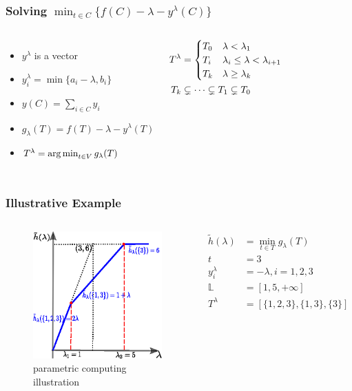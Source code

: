 \documentclass[notheorems]{beamer}
\begin{document}
\begin{frame}
	\frametitle{Solving $\min_{t\in C} \{f(C) - \lambda - y^{\lambda}(C)\}$}
	\begin{columns}
    \column{5.3cm}
    \begin{itemize}
	\item $y^{\lambda}$ is a vector
	\item $y^{\lambda}_i = \min\{a_i - \lambda, b_i\}$ 
	\item $y(C) = \sum_{i \in C} y_i$	
	\item $g_{\lambda}(T) = f(T) - \lambda - y^{\lambda}(T)$
	\item $T^{\lambda} = \operatorname*{arg\,min}_{t\in V} g_{\lambda}(T)$
	\end{itemize}
	\begin{theorem}
		\begin{align}\notag
			T^{\lambda} & =\begin{cases}
				T_0 & \lambda < \lambda_1 \\
				T_i & \lambda_i \leq \lambda < \lambda_{i+1}\\
				T_k & \lambda \geq \lambda_{k}
			\end{cases} \\
				T_k & \subsetneq  \dots \subsetneq T_1 \subsetneq T_0 \label{eq:Alambda}				
		\end{align}
    \end{theorem}
	\column{4.7cm}
		
    \end{columns}
\end{frame}
\begin{frame}
	\frametitle{Illustrative Example}
\begin{columns}
	\column{5cm}
	\begin{figure}
		\includegraphics[width=5cm]{pic/example_pst_single.eps}
		\caption{parametric computing illustration}
	\end{figure}
	\column{5cm}
	\begin{align*}
	\tilde{h}(\lambda) &= \min_{t \in T} g_{\lambda}(T)\\
	t & = 3 \\
	y^{\lambda}_i & = -\lambda, i=1,2,3 \\
    \mathbb{L} & = [1, 5, +\infty] \\
	T^{\lambda} &= [\{1,2,3\}, \{1,3\}, \{3\}]
	\end{align*}
\end{columns}	
\end{frame}	
\end{document}
